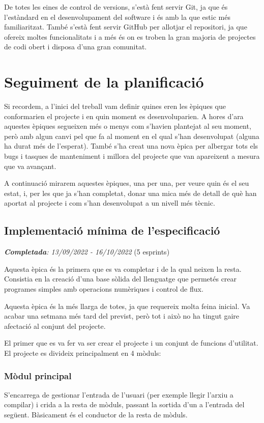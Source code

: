 ﻿\documentclass{article}
\begin{document}
De totes les eines de control de versions, s'està fent servir Git, ja que és
l'estàndard en el desenvolupament del software i és amb la que estic més 
familiaritzat. També s'està fent servir GitHub per allotjar el repositori, ja 
que ofereix moltes funcionalitats i a més és on es troben la gran majoria de
projectes de codi obert i disposa d'una gran comunitat.

\section{Seguiment de la planificació}

Si recordem, a l'inici del treball vam definir quines eren les èpiques que
conformarien el projecte i en quin moment es desenvoluparien. A hores d'ara
aquestes èpiques segueixen més o menys com s'havien plantejat al seu moment,
però amb algun canvi pel que fa al moment en el qual s'han desenvolupat (alguna
ha durat més de l'esperat). També s'ha creat una nova èpica per albergar tots
els bugs i tasques de manteniment i millora del projecte que van apareixent a
mesura que va avançant. 

A continuació mirarem aquestes èpiques, una per una, per veure quin és el seu
estat, i, per les que ja s'han completat, donar una mica més de detall de què
han aportat al projecte i com s'han desenvolupat a un nivell més tècnic.


\subsection{Implementació mínima de l'especificació}
\textit{\textbf{Completada}: 13/09/2022 - 16/10/2022} (5 esprints)

Aquesta èpica és la primera que es va completar i de la qual neixen la resta.
Consistia en la creació d'una base sòlida del llenguatge que permetés crear
programes simples amb operacions numèriques i control de flux.

Aquesta èpica és la més llarga de totes, ja que requereix molta feina inicial.
Va acabar una setmana més tard del previst, però tot i això no ha tingut gaire
afectació al conjunt del projecte.

El primer que es va fer va ser crear el projecte i un conjunt de funcions
d'utilitat. El projecte es divideix principalment en 4 mòduls:

\subsubsection{Mòdul principal}
S'encarrega de gestionar l'entrada de l'usuari (per exemple llegir l'arxiu a
compilar) i crida a la resta de mòduls, passant la  sortida d'un a l'entrada del
següent. Bàsicament és el conductor de la resta de mòduls.
\end{document}

